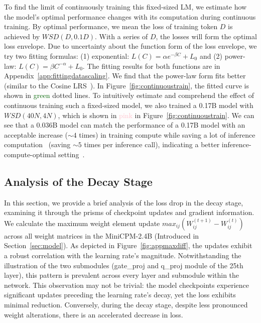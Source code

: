 To find the limit of continuously training this fixed-sized LM, we estimate how the model's optimal performance changes with its computation during continuous training. By optimal performance, we mean the loss of training token $D$ is achieved by ${WSD}(D, 0.1D)$. With a series of $D$, the losses will form the optimal loss envelope. Due to uncertainty about the function form of the loss envelope, we try two fitting formulas: (1) exponential: $L(C) = \alpha e^{-\beta C} + L_0$ and (2) power-law: $L(C) = \beta C^{-\alpha} + L_0$. The fitting results for both functions are in Appendix~\ref{app:fittingdatascaling}. We find that the power-law form fits better (similar to the Cosine LRS~\citep{kaplan2020scaling}). In Figure~\ref{fig:continuoustrain}, the fitted curve is shown in \textcolor{darkgreen}{green} dotted lines. To intuitively estimate and comprehend the effect of continuous training such a fixed-sized model, we also trained a 0.17B model with $WSD(40N, 4N)$, which is shown in \textcolor{pink}{pink} in Figure~\ref{fig:continuoustrain}.  We can see that a 0.036B model can match the performance of a 0.17B model with an acceptable increase ($\sim 4$ times) in training compute while saving a lot of inference computation~\citep{sardana2023beyond} (saving $\sim 5$ times per inference call), indicating a better inference-compute-optimal setting~\citep{sardana2023beyond}.






\subsection{Analysis of the Decay Stage}
In this section, we provide a brief analysis of the loss drop in the decay stage, examining it through the prisms of checkpoint updates and gradient information.  We calculate the maximum weight element update $max_{ij} (W_{ij}^{(t+1)} - W_{ij}^{(t)})$ across all weight matrices in the MiniCPM-2.4B (Introduced in Section~\ref{sec:model}). As depicted in Figure~\ref{fig:appmaxdiff}, the updates exhibit a robust correlation with the learning rate's magnitude. Notwithstanding the illustration of the two submodules (gate\_proj and q\_proj module of the 25th layer), this pattern is prevalent across every layer and submodule within the network. This observation may not be trivial: the model checkpoints experience significant updates preceding the learning rate's decay, yet the loss exhibits minimal reduction. Conversely, during the decay stage, despite less pronounced weight alterations, there is an accelerated decrease in loss.  


